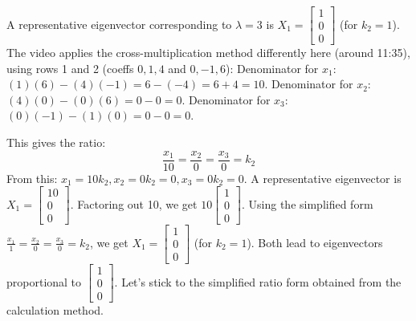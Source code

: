 \documentclass{article}
\begin{document}
A representative eigenvector corresponding to $\lambda = 3$ is $X_1 = \begin{bmatrix} 1 \\ 0 \\ 0 \end{bmatrix}$ (for $k_2=1$).
The video applies the cross-multiplication method differently here (around 11:35), using rows 1 and 2 (coeffs $0, 1, 4$ and $0, -1, 6$):
Denominator for $x_1$: $(1)(6) - (4)(-1) = 6 - (-4) = 6 + 4 = 10$.
Denominator for $x_2$: $(4)(0) - (0)(6) = 0 - 0 = 0$.
Denominator for $x_3$: $(0)(-1) - (1)(0) = 0 - 0 = 0$.

This gives the ratio:
\[ \frac{x_1}{10} = \frac{x_2}{0} = \frac{x_3}{0} = k_2 \]
From this: $x_1 = 10k_2, x_2 = 0k_2 = 0, x_3 = 0k_2 = 0$. A representative eigenvector is $X_1 = \begin{bmatrix} 10 \\ 0 \\ 0 \end{bmatrix}$. Factoring out 10, we get $10 \begin{bmatrix} 1 \\ 0 \\ 0 \end{bmatrix}$.
Using the simplified form $\frac{x_1}{1} = \frac{x_2}{0} = \frac{x_3}{0} = k_2$, we get $X_1 = \begin{bmatrix} 1 \\ 0 \\ 0 \end{bmatrix}$ (for $k_2=1$). Both lead to eigenvectors proportional to $\begin{bmatrix} 1 \\ 0 \\ 0 \end{bmatrix}$. Let's stick to the simplified ratio form obtained from the calculation method.
\end{document}
